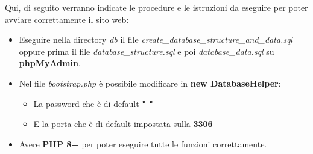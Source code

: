 \documentclass[a4paper,12pt]{report}
\begin{document}
	\textsf{\small Qui, di seguito verranno indicate le procedure e le istruzioni da eseguire per poter avviare correttamente il sito web: } \\
	
	\begin{itemize}
		\item \textsf{\small Eseguire nella directory \emph{db} il file \emph{create\_database\_structure\_and\_data.sql} oppure prima il file \emph{database\_structure.sql} e poi \emph{database\_data.sql} su \textbf{phpMyAdmin}.}
		\item \textsf{\small Nel file \emph{bootstrap.php} è possibile modificare in \textbf{new DatabaseHelper}:}
		\begin{itemize}
			\item \textsf{\small La password che è di default \textbf{" "}}
			\item \textsf{\small E la porta che è di default impostata sulla \textbf{3306}}
		\end{itemize}
		\item \textsf{\small Avere \textbf{PHP 8+} per poter eseguire tutte le funzioni correttamente.}
	\end{itemize}
\end{document}
